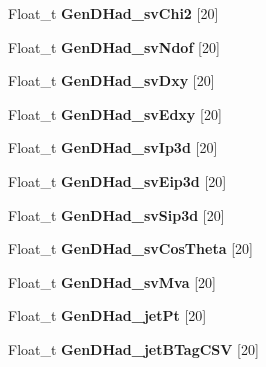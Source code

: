 \begin{DoxyCompactItemize}
\hypertarget{classMiniTree_a5c81b581739e26c3a9882dd6e500c945}{}\label{classMiniTree_a5c81b581739e26c3a9882dd6e500c945} 
Float\+\_\+t {\bfseries Gen\+D\+Had\+\_\+sv\+Chi2} \mbox{[}20\mbox{]}
\item 
\hypertarget{classMiniTree_a1a2c7a7bfd89583aa7a1e034e2d42aba}{}\label{classMiniTree_a1a2c7a7bfd89583aa7a1e034e2d42aba} 
Float\+\_\+t {\bfseries Gen\+D\+Had\+\_\+sv\+Ndof} \mbox{[}20\mbox{]}
\item 
\hypertarget{classMiniTree_a3f6b09b5f30c4a9cd60d2f29a7ec6429}{}\label{classMiniTree_a3f6b09b5f30c4a9cd60d2f29a7ec6429} 
Float\+\_\+t {\bfseries Gen\+D\+Had\+\_\+sv\+Dxy} \mbox{[}20\mbox{]}
\item 
\hypertarget{classMiniTree_ad231f4914c927509a959a9b68de3b73c}{}\label{classMiniTree_ad231f4914c927509a959a9b68de3b73c} 
Float\+\_\+t {\bfseries Gen\+D\+Had\+\_\+sv\+Edxy} \mbox{[}20\mbox{]}
\item 
\hypertarget{classMiniTree_a8d5a3ac1102cfbe9f26f4c5dd18a3458}{}\label{classMiniTree_a8d5a3ac1102cfbe9f26f4c5dd18a3458} 
Float\+\_\+t {\bfseries Gen\+D\+Had\+\_\+sv\+Ip3d} \mbox{[}20\mbox{]}
\item 
\hypertarget{classMiniTree_a39f0090eb16cc8f8a86057ed58565fcd}{}\label{classMiniTree_a39f0090eb16cc8f8a86057ed58565fcd} 
Float\+\_\+t {\bfseries Gen\+D\+Had\+\_\+sv\+Eip3d} \mbox{[}20\mbox{]}
\item 
\hypertarget{classMiniTree_a2f93f1b42a0240ced79d9818977dc23d}{}\label{classMiniTree_a2f93f1b42a0240ced79d9818977dc23d} 
Float\+\_\+t {\bfseries Gen\+D\+Had\+\_\+sv\+Sip3d} \mbox{[}20\mbox{]}
\item 
\hypertarget{classMiniTree_ab13fd6eb58937d24db34b07be29b827f}{}\label{classMiniTree_ab13fd6eb58937d24db34b07be29b827f} 
Float\+\_\+t {\bfseries Gen\+D\+Had\+\_\+sv\+Cos\+Theta} \mbox{[}20\mbox{]}
\item 
\hypertarget{classMiniTree_a2106e53ed81d22f0fc6e9a97197910bb}{}\label{classMiniTree_a2106e53ed81d22f0fc6e9a97197910bb} 
Float\+\_\+t {\bfseries Gen\+D\+Had\+\_\+sv\+Mva} \mbox{[}20\mbox{]}
\item 
\hypertarget{classMiniTree_a04790341581365dba6c096a4df9f591b}{}\label{classMiniTree_a04790341581365dba6c096a4df9f591b} 
Float\+\_\+t {\bfseries Gen\+D\+Had\+\_\+jet\+Pt} \mbox{[}20\mbox{]}
\item 
\hypertarget{classMiniTree_afaa11fefb964cd2e720c6c00fd6d1b86}{}\label{classMiniTree_afaa11fefb964cd2e720c6c00fd6d1b86} 
Float\+\_\+t {\bfseries Gen\+D\+Had\+\_\+jet\+B\+Tag\+C\+SV} \mbox{[}20\mbox{]}
\item 

\end{DoxyCompactItemize}
